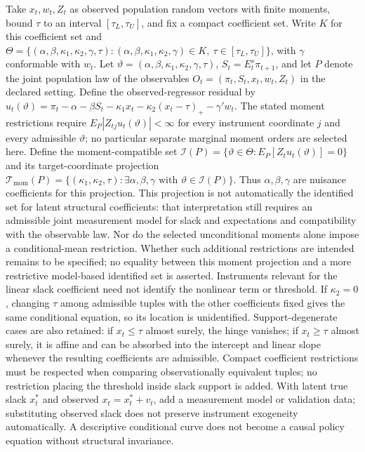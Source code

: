 \documentclass[11pt,a4paper]{article}
\begin{document}
Take \(x_t,w_t,Z_t\) as observed population random vectors with finite moments, bound \(\tau\) to an interval \([\tau_L,\tau_U]\), and fix a compact coefficient set. Write \(K\) for this coefficient set and \(\Theta=\{(\alpha,\beta,\kappa_1,\kappa_2,\gamma,\tau):(\alpha,\beta,\kappa_1,\kappa_2,\gamma)\in K,\ \tau\in[\tau_L,\tau_U]\}\), with \(\gamma\) conformable with \(w_t\). Let \(\vartheta=(\alpha,\beta,\kappa_1,\kappa_2,\gamma,\tau)\), \(S_t=E_t^s\pi_{t+1}\), and let \(P\) denote the joint population law of the observables \(O_t=(\pi_t,S_t,x_t,w_t,Z_t)\) in the declared setting. Define the observed-regressor residual by \(u_t(\vartheta)=\pi_t-\alpha-\beta S_t-\kappa_1x_t-\kappa_2(x_t-\tau)_+-\gamma'w_t\). The stated moment restrictions require \(E_P|Z_{tj}u_t(\vartheta)|<\infty\) for every instrument coordinate \(j\) and every admissible \(\vartheta\); no particular separate marginal moment orders are selected here. Define the moment-compatible set \(\mathcal I(P)=\{\vartheta\in\Theta:E_P[Z_tu_t(\vartheta)]=0\}\) and its target-coordinate projection \(\mathcal T_{\mathrm{mom}}(P)=\{(\kappa_1,\kappa_2,\tau):\exists\alpha,\beta,\gamma\text{ with }\vartheta\in\mathcal I(P)\}\). Thus \(\alpha,\beta,\gamma\) are nuisance coefficients for this projection. This projection is not automatically the identified set for latent structural coefficients: that interpretation still requires an admissible joint measurement model for slack and expectations and compatibility with the observable law. Nor do the selected unconditional moments alone impose a conditional-mean restriction. Whether such additional restrictions are intended remains to be specified; no equality between this moment projection and a more restrictive model-based identified set is asserted. Instruments relevant for the linear slack coefficient need not identify the nonlinear term or threshold. If \(\kappa_2=0\), changing \(\tau\) among admissible tuples with the other coefficients fixed gives the same conditional equation, so its location is unidentified. Support-degenerate cases are also retained: if \(x_t\leq\tau\) almost surely, the hinge vanishes; if \(x_t\geq\tau\) almost surely, it is affine and can be absorbed into the intercept and linear slope whenever the resulting coefficients are admissible. Compact coefficient restrictions must be respected when comparing observationally equivalent tuples; no restriction placing the threshold inside slack support is added. With latent true slack \(x_t^*\) and observed \(x_t=x_t^*+v_t\), add a measurement model or validation data; substituting observed slack does not preserve instrument exogeneity automatically. A descriptive conditional curve does not become a causal policy equation without structural invariance.
\end{document}
